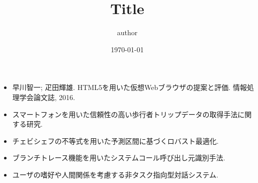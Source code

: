 \documentclass[dvipdfmx,8pt]{beamer}
\title{Title}
\author{author}
\institute{Kaori Lab., Kyushu Institute of Technology}
\date{\today}
\begin{document}
\frame[plain]{
  \titlepage
}
\addtocounter{framenumber}{-1}
\begin{frame}
  \begin{itemize}
    \item 早川智一; 疋田輝雄. HTML5を用いた仮想Webブラウザの提案と評価. 情報処理学会論文誌, 2016. \cite{weko_148195_1}
    \item スマートフォンを用いた信頼性の高い歩行者トリップデータの取得手法に関する研究. \cite{2016d}
    \item チェビシェフの不等式を用いた予測区間に基づくロバスト最適化. \cite{weko_157917_1}
    \item ブランチトレース機能を用いたシステムコール呼び出し元識別手法. \cite{weko_148217_1}
    \item ユーザの嗜好や人間関係を考慮する非タスク指向型対話システム. \cite{2016g}
  \end{itemize}

	
	
\end{frame}

\end{document}
